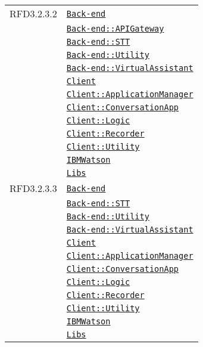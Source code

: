 \begin{longtable}{|>{\centering}m{3cm}|m{10cm}<{\centering}|}
RFD3.2.3.2 & \hyperref[Back-end]{\texttt{Back-end}}\\
& \hyperref[Back-end::APIGateway]{\texttt{Back-end::APIGateway}}\\
& \hyperref[Back-end::STT]{\texttt{Back-end::STT}}\\
& \hyperref[Back-end::Utility]{\texttt{Back-end::Utility}}\\
& \hyperref[Back-end::VirtualAssistant]{\texttt{Back-end::VirtualAssistant}}\\
& \hyperref[Client]{\texttt{Client}}\\
& \hyperref[Client::ApplicationManager]{\texttt{Client::ApplicationManager}}\\
& \hyperref[Client::ConversationApp]{\texttt{Client::ConversationApp}}\\
& \hyperref[Client::Logic]{\texttt{Client::Logic}}\\
& \hyperref[Client::Recorder]{\texttt{Client::Recorder}}\\
& \hyperref[Client::Utility]{\texttt{Client::Utility}}\\
& \hyperref[IBMWatson]{\texttt{IBMWatson}}\\
& \hyperref[Libs]{\texttt{Libs}}\\ \hline

RFD3.2.3.3 & \hyperref[Back-end]{\texttt{Back-end}}\\
& \hyperref[Back-end::STT]{\texttt{Back-end::STT}}\\
& \hyperref[Back-end::Utility]{\texttt{Back-end::Utility}}\\
& \hyperref[Back-end::VirtualAssistant]{\texttt{Back-end::VirtualAssistant}}\\
& \hyperref[Client]{\texttt{Client}}\\
& \hyperref[Client::ApplicationManager]{\texttt{Client::ApplicationManager}}\\
& \hyperref[Client::ConversationApp]{\texttt{Client::ConversationApp}}\\
& \hyperref[Client::Logic]{\texttt{Client::Logic}}\\
& \hyperref[Client::Recorder]{\texttt{Client::Recorder}}\\
& \hyperref[Client::Utility]{\texttt{Client::Utility}}\\
& \hyperref[IBMWatson]{\texttt{IBMWatson}}\\
& \hyperref[Libs]{\texttt{Libs}}\\ \hline


\end{longtable}
